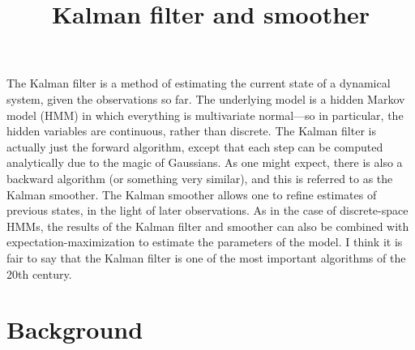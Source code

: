 \documentclass[12pt]{article}
\title{Kalman filter and smoother}
\author{}
\date{}
\begin{document}
\maketitle

\tableofcontents



\vspace{2em}


The Kalman filter is a method of estimating the current state of a dynamical system, given the observations so far. The underlying model is a hidden Markov model (HMM) in which everything is multivariate normal---so in particular, the hidden variables are continuous, rather than discrete. The Kalman filter is actually just the forward algorithm, except that each step can be computed analytically due to the magic of Gaussians. As one might expect, there is also a backward algorithm (or something very similar), and this is referred to as the Kalman smoother.  The Kalman smoother allows one to refine estimates of previous states, in the light of later observations. As in the case of discrete-space HMMs, the results of the Kalman filter and smoother can also be combined with expectation-maximization to estimate the parameters of the model. I think it is fair to say that the Kalman filter is one of the most important algorithms of the 20th century.

\newpage

\section{Background}
\end{document}
